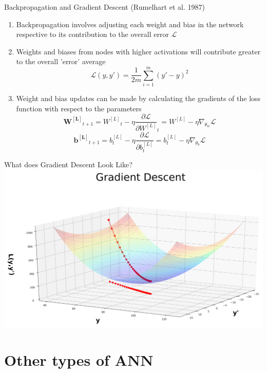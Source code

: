\documentclass{beamer}
\begin{document}
\begin{frame}{Backpropagation and Gradient Descent (Rumelhart et al. 1987)}
    \begin{enumerate}[1.]
        \item Backpropagation involves adjusting each weight and bias in the network respective to its contribution to the overall error $\mathcal{L}$
        \item Weights and biases from nodes with higher activations will contribute greater to the overall 'error' average
        $$\mathcal{L}(y,y')=\frac{1}{2m}\sum^m_{i=1}(y'-y)^2$$
        \item Weight and bias updates can be made by calculating the gradients of the loss function with respect to the parameters
        $$\mathbf{W^{[L]}}_{t+1}={W^{[L]}}_t-\eta\frac{\partial\mathcal{L}}{\partial W^{[L]}}_t=W^{[L]}-\eta\nabla_{\theta_w}\mathcal{L}$$
        $$\mathbf{b^{[L]}}_{t+1}=b^{[L]}_t-\eta\frac{\partial\mathcal{L}}{\partial b^{[L]}_t}=b^{[L]}_t-\eta\nabla_{\theta_b}\mathcal{L}$$
    \end{enumerate}
\end{frame}
\begin{frame}{What does Gradient Descent Look Like?}
    \includegraphics[width=\textwidth]{images/gradientdescent.jpg}
\end{frame}
\section{Other types of ANN}
\end{document}
